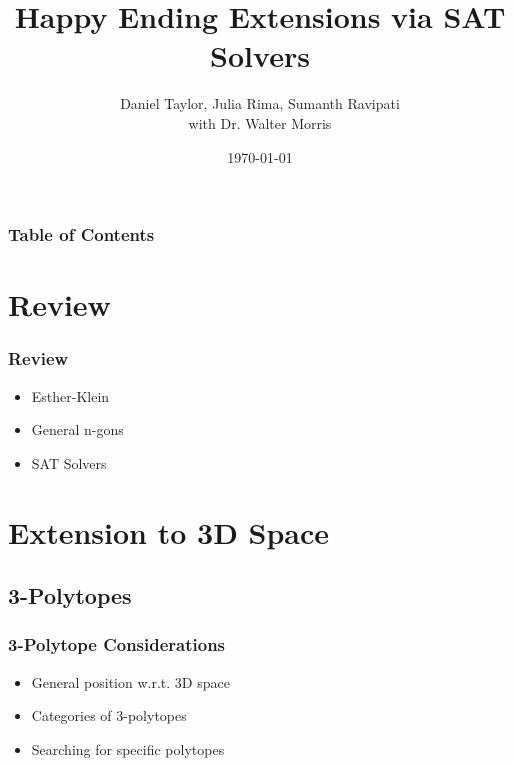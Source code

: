 \documentclass{beamer}
\title{Happy Ending Extensions via SAT Solvers}
\author{Daniel Taylor, Julia Rima, Sumanth Ravipati
\\ with Dr. Walter Morris}
\institute{George Mason University, MEGL}
\date{\today}
\begin{document}
\begin{frame}
    \titlepage
\end{frame}

\begin{frame}
    \frametitle{Table of Contents}
        \tableofcontents
\end{frame}



\section{Review}

\begin{frame}
    \frametitle{Review}
    \begin{itemize}
        \item Esther-Klein
        \item General n-gons
        \item SAT Solvers
    \end{itemize}
\end{frame}

\section{Extension to 3D Space}

\subsection{3-Polytopes} 
\begin{frame}
    \frametitle{3-Polytope Considerations}
    \begin{itemize}
        \item General position w.r.t. 3D space
        \item Categories of 3-polytopes
        \item Searching for specific polytopes
    \end{itemize}
\end{frame}

\end{document}
